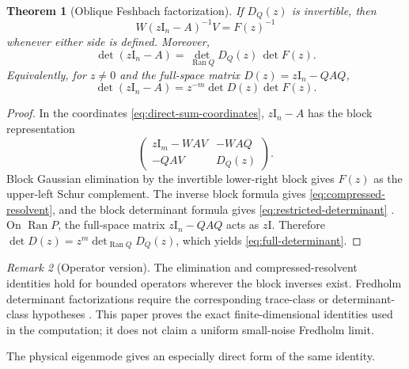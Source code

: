 \documentclass[11pt]{article}
\newtheorem{theorem}{Theorem}[section]
\theoremstyle{definition}
\theoremstyle{remark}
\newtheorem{remark}[theorem]{Remark}
\newcommand{\Id}{\mathrm I}
\newcommand{\Ran}{\operatorname{Ran}}
\begin{document}
\begin{theorem}[Oblique Feshbach factorization]
\label{thm:feshbach}
If $D_Q(z)$ is invertible, then
\begin{equation}
\label{eq:compressed-resolvent}
 W(z\Id_n-A)^{-1}V=F(z)^{-1}
\end{equation}
whenever either side is defined.  Moreover,
\begin{equation}
\label{eq:restricted-determinant}
 \det(z\Id_n-A)=\det_{\Ran Q}D_Q(z)\,\det F(z).
\end{equation}
Equivalently, for $z\ne0$ and the full-space matrix
$D(z)=z\Id_n-QAQ$,
\begin{equation}
\label{eq:full-determinant}
 \boxed{
 \det(z\Id_n-A)
 =z^{-m}\det D(z)\det F(z)}.
\end{equation}
\end{theorem}

\begin{proof}
In the coordinates \eqref{eq:direct-sum-coordinates}, $z\Id_n-A$ has the
block representation
\begin{equation}
\label{eq:block-matrix}
 \begin{pmatrix}
 z\Id_m-WAV & -WAQ\\
 -QAV & D_Q(z)
 \end{pmatrix}.
\end{equation}
Block Gaussian elimination by the invertible lower-right block gives
$F(z)$ as the upper-left Schur complement.  The inverse block formula gives
\eqref{eq:compressed-resolvent}, and the block determinant formula gives
\eqref{eq:restricted-determinant} \citep{Zhang2005,SjoestrandZworski2007}.
On $\Ran P$, the full-space matrix $z\Id_n-QAQ$ acts as $z\Id$.  Therefore
$\det D(z)=z^m\det_{\Ran Q}D_Q(z)$, which yields
\eqref{eq:full-determinant}.
\end{proof}

\begin{remark}[Operator version]
The elimination and compressed-resolvent identities hold for bounded
operators wherever the block inverses exist.  Fredholm determinant
factorizations require the corresponding trace-class or determinant-class
hypotheses \citep{GohbergKrein1969,Baladi2000}.  This paper proves the exact
finite-dimensional identities used in the computation; it does not claim a
uniform small-noise Fredholm limit.
\end{remark}

The physical eigenmode gives an especially direct form of the same
identity.
\end{document}
